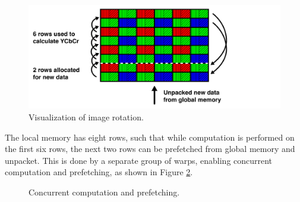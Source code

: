\begin{figure}[H]
    \centering
    \includegraphics[width=\textwidth]{figures/polarized_image/rolling.pdf}
    \caption{Visualization of image rotation.}
    \label{fig:reuse}
\end{figure}

The local memory has eight rows, such that while computation is performed on the first six rows, the next two rows can be prefetched from global memory and unpacket.
This is done by a separate group of warps, enabling concurrent computation and prefetching, as shown in Figure \ref{fig:saperation}.


\begin{figure}[H]
    \centering
    \caption{Concurrent computation and prefetching.}
    \label{fig:saperation}
\end{figure}



